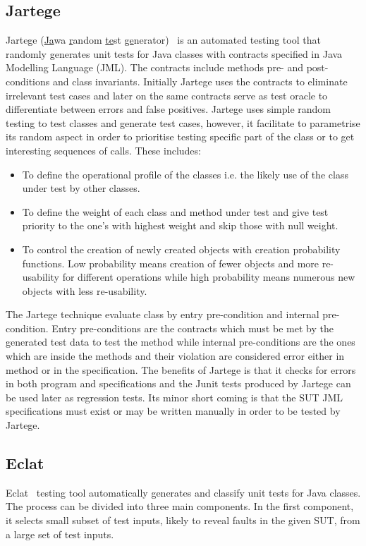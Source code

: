 \subsection{Jartege}
Jartege (\uline{Ja}wa \uline{r}andom \uline{te}st \uline{ge}nerator)~\cite{Oriat2004} is an automated testing tool that randomly generates unit tests for Java classes with contracts specified in Java Modelling Language (JML). The contracts include methods pre- and post-conditions and class invariants. Initially Jartege uses the contracts to eliminate irrelevant test cases and later on the same contracts serve as test oracle to differentiate between errors and false positives. Jartege uses simple random testing to test classes and generate test cases, however, it facilitate to parametrise its random aspect in order to prioritise testing specific part of the class or to get interesting sequences of calls. These includes: 
\begin{itemize}
\item To define the operational profile of the classes i.e. the likely use of the class under test by other classes.  
\item To define the weight of each class and method under test and give test priority to the one's with highest weight and skip those with null weight.
\item To control the creation of newly created objects with creation probability functions. Low probability means creation of fewer objects and more re-usability for different operations while high probability means numerous new objects with less re-usability.
\end{itemize}

\noindent The Jartege technique evaluate class by entry pre-condition and internal pre-condition. Entry pre-conditions are the contracts which must be met by the generated test data to test the method while internal pre-conditions are the ones which are inside the methods and their violation are considered error either in method or in the specification. The benefits of Jartege is that it checks for errors in both program and specifications and the Junit tests produced by Jartege can be used later as regression tests. Its minor short coming is that the SUT JML specifications must exist or may be written manually in order to be tested by Jartege.

\subsection{Eclat}
Eclat~\cite{Pacheco2005} testing tool automatically generates and classify unit tests for Java classes. The process can be divided into three main components. In the first component, it selects small subset of test inputs, likely to reveal faults in the given SUT, from a large set of test inputs.

